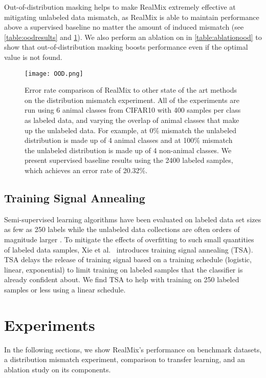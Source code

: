 \documentclass[10pt,twocolumn,letterpaper]{article}
\begin{document}
Out-of-distribution masking helps to make RealMix extremely effective at mitigating unlabeled data mismatch, as RealMix is able to maintain performance above a supervised baseline no matter the amount of induced mismatch (see \cref{table:oodresults} and \cref{fig:OOD}). We also perform an ablation on  in \cref{table:ablationood} to show that out-of-distribution masking boosts performance even if the optimal  value is not found.

\begin{figure}[t!]
    \texttt{[image: OOD.png]}
    \caption{Error rate comparison of RealMix to other state of the art methods on the distribution mismatch experiment. All of the experiments are run using 6 animal classes from CIFAR10 with 400 samples per class as labeled data, and varying the overlap of animal classes that make up the unlabeled data. For example, at 0\% mismatch the unlabeled distribution is made up of 4 animal classes and at 100\% mismatch the unlabeled distribution is made up of 4 non-animal classes. We present supervised baseline results using the 2400 labeled samples, which achieves an error rate of 20.32\%.}
    \label{fig:OOD}
\end{figure}

\subsection{Training Signal Annealing}

Semi-supervised learning algorithms have been evaluated on labeled data set sizes as few as 250 labels while the unlabeled data collections are often orders of magnitude larger \cite{mixmatchBerthelot, realisticevalOliver, ictVerma, udaXie}. To mitigate the effects of overfitting to such small quantities of labeled data samples, Xie et al.~\cite{udaXie} introduces training signal annealing (TSA). TSA delays the release of training signal based on a training schedule (logistic, linear, exponential) to limit training on labeled samples that the classifier is already confident about. We find TSA to help with training on 250 labeled samples or less using a linear schedule. 

\section{Experiments}
\label{experiments:main}
In the following sections, we show RealMix's performance on benchmark datasets, a distribution mismatch experiment, comparison to transfer learning, and an ablation study on its components.
\end{document}
